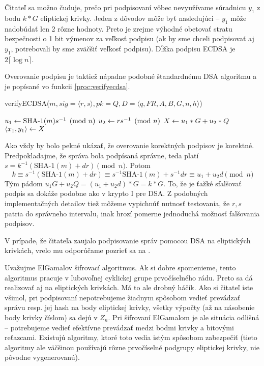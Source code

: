 Čitateľ sa možno čuduje, prečo pri podpisovaní vôbec nevyužívame
súradnicu $y_1$ z bodu $k*G$ eliptickej krivky. Jeden z dôvodov môže
byť nasledujúci -- $y_1$ môže nadobúdať len 2 rôzne hodnoty. Preto
je zrejme výhodné obetovať stratu bezpečnosti o 1 bit výmenov za veľkosť
podpisu (ak by sme chceli podpisovať aj $y_1$, potrebovali by sme
zväčšiť veľkosť podpisu). Dĺžka podpisu ECDSA je $2 \lceil \log n \rceil$.

Overovanie podpisu je taktiež nápadne podobné štandardnému DSA
algoritmu a je popísané vo funkcii \ref{proc:verifyecdsa}.

\begin{procedure}[H]
    \caption{verifyECDSA($m,sig=\langle r,s \rangle,pk= Q,
            D=\langle q,FR, A,B,G,n,h \rangle$)}
    \label{proc:verifyecdsa}
    \;
    $u_1 \leftarrow \mbox{SHA-1}(m) s^{-1}\pmod{n}$ \;
    $u_2 \leftarrow r s^{-1} \pmod{n}$ \;
    $X \leftarrow u_1 * G + u_2 * Q$ \;
    $ \langle x_1, y_1 \rangle \leftarrow X$ \;
\end{procedure}

Ako vždy by bolo pekné ukázať, že overovanie korektných podpisov
je korektné.
Predpokladajme, že správa bola podpísaná správne, teda platí
$s = k^{-1} (\mbox{SHA-1}(m) + d r) \pmod{n}$.
Potom 
\begin{equation*}
    k \equiv s^{-1} (\mbox{SHA-1}(m) + d r)  \equiv
    s^{-1} \mbox{SHA-1}(m) + s^{-1} d r \equiv u_1 + u_2 d \pmod{n}
\end{equation*}
Tým pádom $u_1 G + u_2 Q = (u_1 + u_2 d)*G = k*G$.
To, že je ťažké sfalšovať podpis sa dokáže podobne ako v krypto I pre
DSA. Z podobných implementačných detailov tiež môžeme vypichnúť
nutnosť testovania,
že $r,s$ patria do správneho intervalu, inak hrozí pomerne jednoduchá
možnosť falšovania podpisov.

V prípade, že čitateľa zaujalo podpisovanie správ pomocou DSA na eliptických
krivkách, vrelo mu odporúčame pozrieť sa na \cite{ecdsa}.

\begin{poznamka}
    Uvažujme ElGamalov šifrovací algoritmus. Ak si dobre spomenieme,
    tento algoritmus pracuje v ľubovoľnej cyklickej grupe
    prvočíselného rádu. Preto sa dá realizovať aj na eliptických
    krivkách. Má to ale drobný háčik.
    Ako si čitateľ iste všimol, pri podpisovaní nepotrebujeme
    žiadnym spôsobom vedieť prevádzať správu resp. jej hash na body
    eliptickej krivky, všetky výpočty (až na násobenie body krivky
    číslom) sa dejú v $Z_n$. Pri šifrovaní ElGamalom 
    je ale situácia odlišná -- potrebujeme vedieť efektívne prevádzať
    medzi bodmi krivky a bitovými reťazcami. Existujú algoritmy, ktoré
    toto vedia istým spôsobom zabezpečiť (tieto algoritmy ale väčšinou
    používajú rôzne prvočíselné podgrupy eliptickej krivky, nie
    pôvodne vygenerovanú).
\end{poznamka}

